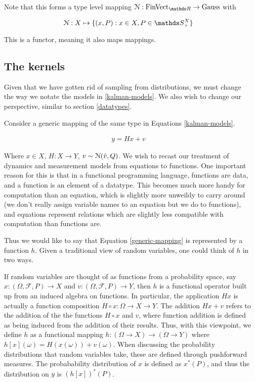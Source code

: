 Note that this forms a type level mapping $\gaussian : \FinVect \rightarrow \gausscat$ with

\begin{equation}
    \gaussian : X \mapsto \{(x,P) : x\in X, P \in \symmetric^X_+\}
\end{equation}

This is a functor, meaning it also maps mappings.

\subsection{The kernels}

Given that we have gotten rid of sampling from distributions, we must change the way we notate the models in \ref{kalman-models}. We also wish to change our perspective, similar to section \ref{datatypes}.

Consider a generic mapping of the same type in Equations \ref{kalman-models}.

\begin{gather}
	\label{generic-mapping}
	y = Hx + v
\end{gather}

Where $x\in X$, $H:X\rightarrow Y$, $v\sim \mathcal{N}(\hat{v}, Q)$.
We wish to recast our treatment of dynamics and measurement models from equations to functions. One important reason for this is that in a functional programming language, functions are data, and a function is an element of a datatype. This becomes much more handy for computation than an equation, which is slightly more unweildy to carry around (we don't really assign variable names to an equation but we do to functions), and equations represent relations which are slightly less compatible with computation than functions are.

Thus we would like to say that Equation \ref{generic-mapping} is represented by a function $h$.
Given a traditional view of random variables, one could think of $h$ in two ways.

If random variables are thought of as functions from a probability space, say $x:(\Omega,\mathcal{F}, P)\rightarrow X$ and $v:(\Omega,\mathcal{F}, P)\rightarrow Y$, then $h$ is a functional operator built up from an induced algebra on functions. In particular, the application $Hx$ is actually a function composition $H\circ x : \Omega \rightarrow X \rightarrow Y$. The addition $Hx + v$ refers to the addition of the the functions $H\circ x$ and $v$, where function addition is defined as being induced from the addition of their results. Thus, with this viewpoint, we define $h$ as a functional mapping $h:(\Omega\rightarrow X) \rightarrow (\Omega\rightarrow Y)$ where $h[x](\omega) = H(x(\omega)) + v(\omega)$. When discussing the probability distributions that random variables take, these are defined through pushforward measures. The probabability distribution of $x$ is defined as $x^*(P)$, and thus the distribution on $y$ is $(h[x])^*(P)$.

